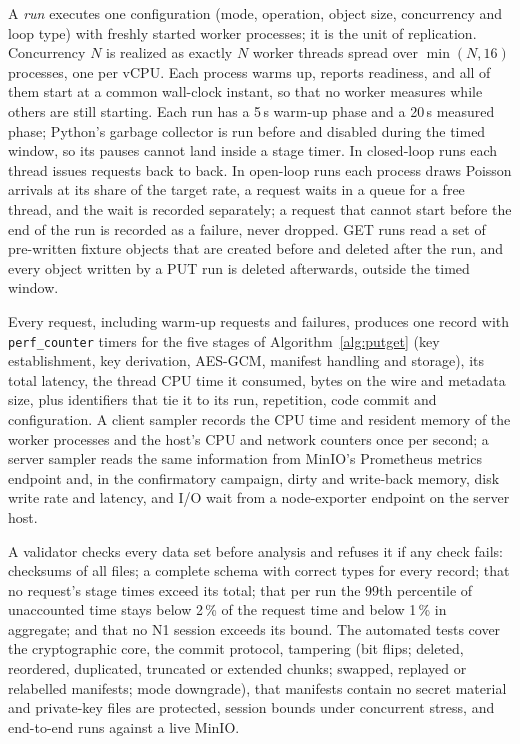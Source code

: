 \documentclass[review,12pt]{elsarticle}
\begin{document}
A \emph{run} executes one configuration (mode, operation, object size, concurrency and loop type)
with freshly started worker processes; it is the unit of replication. Concurrency $N$ is realized
as exactly $N$ worker threads spread over $\min(N,16)$ processes, one per vCPU. Each process warms
up, reports readiness, and all of them start at a common wall-clock instant, so that no worker
measures while others are still starting. Each run has a 5\,s warm-up phase and a 20\,s measured
phase; Python's garbage collector is run before and disabled during the timed window, so its
pauses cannot land inside a stage timer. In closed-loop runs each thread issues requests back to
back. In open-loop runs each process draws Poisson arrivals at its share of the target rate, a
request waits in a queue for a free thread, and the wait is recorded separately; a request that
cannot start before the end of the run is recorded as a failure, never dropped. GET runs read a
set of pre-written fixture objects that are created before and deleted after the run, and every
object written by a PUT run is deleted afterwards, outside the timed window.

Every request, including warm-up requests and failures, produces one record with
\texttt{perf\_counter} timers for the five stages of Algorithm~\ref{alg:putget} (key
establishment, key derivation, AES-GCM, manifest handling and storage), its total latency, the
thread CPU time it consumed, bytes on the wire and metadata size, plus identifiers that tie it to
its run, repetition, code commit and configuration. A client sampler records the CPU time and
resident memory of the worker processes and the host's CPU and network counters once per second;
a server sampler reads the same information from MinIO's Prometheus metrics endpoint and, in
the confirmatory campaign, dirty and write-back memory, disk write rate and latency, and I/O wait
from a node-exporter endpoint on the server host.

A validator checks every data set before analysis and refuses it if any check fails: checksums of
all files; a complete schema with correct types for every record; that no request's stage times
exceed its total; that per run the 99th percentile of unaccounted time stays below 2\,\% of the
request time and below 1\,\% in aggregate; and that no N1 session exceeds its bound. The
\TestCount{} automated tests cover the cryptographic core, the commit protocol, tampering (bit flips; deleted, reordered, duplicated, truncated or extended chunks; swapped, replayed or relabelled manifests; mode downgrade), that manifests contain no secret material and private-key files are protected, session bounds under concurrent stress, and
end-to-end runs against a live MinIO.
\end{document}
